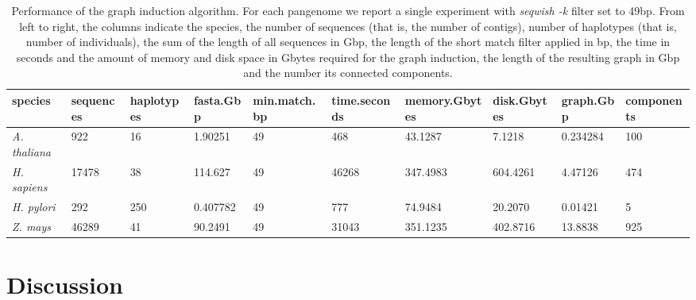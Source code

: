 \documentclass{bioinfo}
\theoremstyle{definition}
\newcommand{\red}[1]{{\textcolor{Red}{#1}}}
\newcommand{\FIXME}[1]{\red{[FIXME: #1]}}
\begin{document}
\begin{table*}[!ht]
    \centering
    \caption{Performance of the graph induction algorithm.
        For each pangenome we report a single experiment with \textit{seqwish -k} filter set to 49bp.
        From left to right, the columns indicate the species, the number of sequences (that is, the number of contigs), number of haplotypes (that is, number of individuals), the sum of the length of all sequences in Gbp, the length of the short match filter applied in bp, the time in seconds and the amount of memory and disk space in Gbytes required for the graph induction, the length of the resulting graph in Gbp and the number its connected components.
        }
    \label{tab:experiments}
    \begin{tabular}{|l|l|l|l|l|l|l|l|l|l|}
        \hline
        species & sequences & haplotypes & fasta.Gbp & min.match.bp & time.seconds & memory.Gbytes & disk.Gbytes & graph.Gbp & components \\ \hline
        \textit{A. thaliana} & 922 & 16 & 1.90251 & 49 & 468 & 43.1287 & 7.1218 & 0.234284 & 100 \\ \hline
        \textit{H. sapiens} & 17478 & 38 & 114.627 & 49 & 46268 & 347.4983 & 604.4261 & 4.47126 & 474 \\ \hline
        \textit{H. pylori} & 292 & 250 & 0.407782 & 49 & 777 & 74.9484 & 20.2070 & 0.01421 & 5 \\ \hline
        \textit{Z. mays} & 46289 & 41 & 90.2491 & 49 & 31043 & 351.1235 & 402.8716 & 13.8838 & 925 \\ \hline
    \end{tabular}
\end{table*}








\section{Discussion}
\label{sec:discussion}
\end{document}
